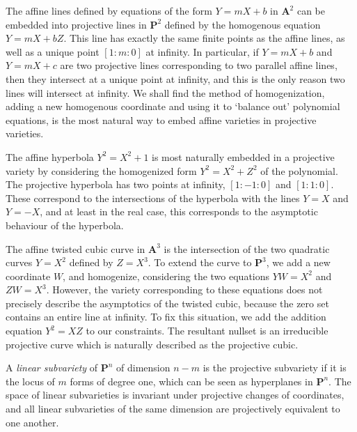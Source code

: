 \begin{example}
    The affine lines defined by equations of the form $Y = mX + b$ in $\mathbf{A}^2$ can be embedded into projective lines in $\mathbf{P}^2$ defined by the homogenous equation $Y = mX + bZ$. This line has exactly the same finite points as the affine lines, as well as a unique point $[1:m:0]$ at infinity. In particular, if $Y = mX + b$ and $Y = mX + c$ are two projective lines corresponding to two parallel affine lines, then they intersect at a unique point at infinity, and this is the only reason two lines will intersect at infinity. We shall find the method of homogenization, adding a new homogenous coordinate and using it to `balance out' polynomial equations, is the most natural way to embed affine varieties in projective varieties.
\end{example}

\begin{example}
    The affine hyperbola $Y^2 = X^2 + 1$ is most naturally embedded in a projective variety by considering the homogenized form $Y^2 = X^2 + Z^2$ of the polynomial. The projective hyperbola has two points at infinity, $[1:-1:0]$ and $[1:1:0]$. These correspond to the intersections of the hyperbola with the lines $Y = X$ and $Y = -X$, and at least in the real case, this corresponds to the asymptotic behaviour of the hyperbola.
\end{example}

\begin{example}
    The affine twisted cubic curve in $\mathbf{A}^3$ is the intersection of the two quadratic curves $Y = X^2$ defined by $Z = X^3$. To extend the curve to $\mathbf{P}^3$, we add a new coordinate $W$, and homogenize, considering the two equations $YW = X^2$ and $ZW = X^3$. However, the variety corresponding to these equations does not precisely describe the asymptotics of the twisted cubic, because the zero set contains an entire line at infinity. To fix this situation, we add the addition equation $Y^2 = XZ$ to our constraints. The resultant nullset is an irreducible projective curve which is naturally described as the projective cubic.
\end{example}

\begin{example}
    A \emph{linear subvariety} of $\mathbf{P}^n$ of dimension $n-m$ is the projective subvariety if it is the locus of $m$ forms of degree one, which can be seen as hyperplanes in $\mathbf{P}^n$. The space of linear subvarieties is invariant under projective changes of coordinates, and all linear subvarieties of the same dimension are projectively equivalent to one another.
\end{example}


